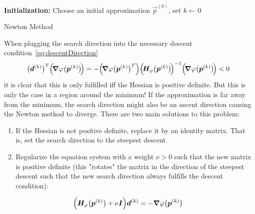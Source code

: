 			\begin{algorithm}  \DontPrintSemicolon
				\textbf{Initialization:} Choose an initial approximation \(\vec{p}^{(0)}\), set \( k \gets 0 \) \;

				\caption{Newton Method}
				\label{alg:newtonMethod}
			\end{algorithm}

			When plugging the search direction into the necessary descent condition~\eqref{eq:descentDirection}
			\begin{align*}
				\big(\bm{d}^{(k)}\big)^T \Big(\!\grad{\varphi}\big(\bm{p}^{(k)}\big)\!\Big)
				= -\Big(\!\grad{\varphi}\big(\bm{p}^{(k)}\big)^T\Big) \Big(\!\bm{H}_\varphi\big(\bm{p}^{(k)}\big)\!\Big)^{-1} \Big(\!\grad{\varphi}\big(\bm{p}^{(k)}\big)\!\Big)
				< 0
			\end{align*}
			it is clear that this is only fulfilled iff the Hessian is positive definite. But this is only the case in a region around the minimum! If the approximation is far away from the minimum, the search direction might also be an ascent direction causing the Newton method to diverge. There are two main solutions to this problem:
			\begin{enumerate}
				\item If the Hessian is not positive definite, replace it by an identity matrix. That is, set the search direction to the steepest descent.
				\item Regularize the equation system with a weight \( \nu > 0 \) such that the new matrix is positive definite (this "rotates" the matrix in the direction of the steepest descent such that the new search direction always fulfills the descent condition):
			\end{enumerate}
			\begin{align*}
				\Big( \bm{H}_\varphi\big(\bm{p}^{(k)}\big) + \nu \bm{I} \Big) \bm{d}^{(k)} = -\grad{\varphi}\big(\bm{p}^{(k)}\big)
			\end{align*}


